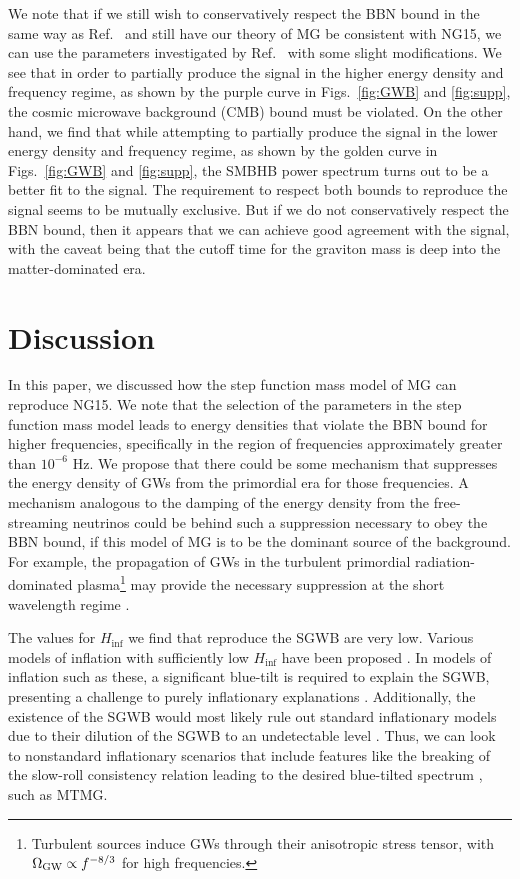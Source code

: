 \documentclass[prd,twocolumn,aps,psfig,nofootinbib,nobibnotes,superscriptaddress,preprintnumbers,times]{revtex4-2}
\begin{document}
We note that if we still wish to conservatively respect the BBN bound in the same way as Ref.\ \cite{Fujita:2018ehq} and still have our theory of MG be consistent with NG15, we can use the parameters investigated by Ref.\ \cite{Fujita:2018ehq} with some slight modifications. We see that in order to partially produce the signal in the higher energy density and frequency regime, as shown by the purple curve in Figs.\ \ref{fig:GWB} and \ref{fig:supp}, the cosmic microwave background (CMB) bound must be violated. On the other hand, we find that while attempting to partially produce the signal in the lower energy density and frequency regime, as shown by the golden curve in Figs.\ \ref{fig:GWB} and \ref{fig:supp}, the SMBHB power spectrum turns out to be a better fit to the signal. The requirement to respect both bounds to reproduce the signal seems to be mutually exclusive. But if we do not conservatively respect the BBN bound, then it appears that we can achieve good agreement with the signal, with the caveat being that the cutoff time for the graviton mass is deep into the matter-dominated era.

\section{Discussion}\label{sec:discussion}
In this paper, we discussed how the step function mass model of MG can reproduce NG15. We note that the selection of the parameters in the step function mass model leads to energy densities that violate the BBN bound for higher frequencies, specifically in the region of frequencies approximately greater than $10^{-6}$ Hz. We propose that there could be some mechanism that suppresses the energy density of GWs from the primordial era for those frequencies. A mechanism analogous to the damping of the energy density from the free-streaming neutrinos \cite{Durrer:1997ta,Weinberg:2003ur} could be behind such a suppression necessary to obey the BBN bound, if this model of MG is to be the dominant source of the background. For example, the propagation of GWs in the turbulent primordial radiation-dominated plasma\footnote{Turbulent sources induce GWs through their anisotropic stress tensor, with $\Omega_{\rm GW} \propto f^{-8/3}$ for high frequencies.} \cite{RoperPol:2019wvy} may provide the necessary suppression at the short wavelength regime \cite{Deryagin:1986}. 

The values for $H_{\inf}$ we find that reproduce the SGWB are very low. Various models of inflation with sufficiently low $H_{\inf}$ have been proposed \cite{Nakayama:2011ri, Takahashi:2018tdu, Drees:2021wgd}. In models of inflation such as these, a significant blue-tilt is required to explain the SGWB, presenting a challenge to purely inflationary explanations \cite{Vagnozzi:2023lwo}. Additionally, the existence of the SGWB would most likely rule out standard inflationary models due to their dilution of the SGWB to an undetectable level \cite{Vagnozzi:2022qmc}. Thus, we can look to nonstandard inflationary scenarios that include features like the breaking of the slow-roll consistency relation leading to the desired blue-tilted spectrum \cite{EPTA:2023xxk}, such as MTMG.
\end{document}
